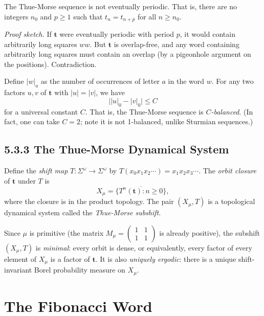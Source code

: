 \begin{theorem}
The Thue-Morse sequence is not eventually periodic. That is, there are no integers $n_0$ and $p \geq 1$ such that $t_n = t_{n+p}$ for all $n \geq n_0$.

\textit{Proof sketch.} If $\mathbf{t}$ were eventually periodic with period $p$, it would contain arbitrarily long squares $w w$. But $\mathbf{t}$ is overlap-free, and any word containing arbitrarily long squares must contain an overlap (by a pigeonhole argument on the positions). Contradiction.
\end{theorem}

\begin{theorem}[Balanced]
Define $|w|_a$ as the number of occurrences of letter $a$ in the word $w$. For any two factors $u, v$ of $\mathbf{t}$ with $|u| = |v|$, we have
\[\big| |u|_0 - |v|_0 \big| \leq C\]
for a universal constant $C$. That is, the Thue-Morse sequence is \textit{$C$-balanced}. (In fact, one can take $C = 2$; note it is not 1-balanced, unlike Sturmian sequences.)
\end{theorem}


\subsection{5.3.3 The Thue-Morse Dynamical System}

Define the \textit{shift map} $T: \Sigma^\omega \to \Sigma^\omega$ by $T(x_0 x_1 x_2 \cdots) = x_1 x_2 x_3 \cdots$. The \textit{orbit closure} of $\mathbf{t}$ under $T$ is
\[X_\mu = \overline{\{ T^n(\mathbf{t}) : n \geq 0\} },\]
where the closure is in the product topology. The pair $(X_\mu, T)$ is a topological dynamical system called the \textit{Thue-Morse subshift}.

Since $\mu$ is primitive (the matrix $M_\mu = \left(\begin{smallmatrix}1&1\\1&1\end{smallmatrix}\right)$ is already positive), the subshift $(X_\mu, T)$ is \textit{minimal}: every orbit is dense, or equivalently, every factor of every element of $X_\mu$ is a factor of $\mathbf{t}$. It is also \textit{uniquely ergodic}: there is a unique shift-invariant Borel probability measure on $X_\mu$.



\section{The Fibonacci Word}

